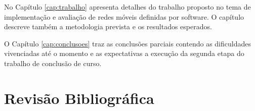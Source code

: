 \documentclass[	12pt, Times, openright, twoside, a4paper, english, brazil]{abntex2}
\begin{document}


No Capítulo \ref{cap:trabalho} apresenta detalhes do trabalho proposto no tema de implementação e avaliação de redes móveis definidas por software. O capítulo descreve também a metodologia prevista e os resultados esperados.

O Capítulo \ref{cap:conclusoes}  traz as conclusões parciais contendo as dificuldades vivenciadas até o momento e as expectativas a execução da segunda etapa do trabalho de conclusão de curso.



\chapter{Revisão Bibliográfica}
\label{cap:revisao}


\end{document}
